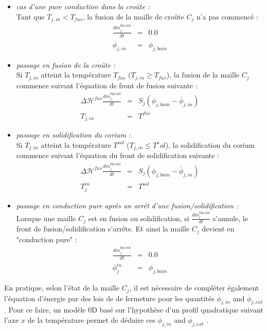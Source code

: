 \begin{itemize}
\item {\it cas d'une pure conduction dans la croûte :}\\
Tant que $T_{j,in}<T_{fus}$, la fusion de la maille de croûte $C_j$ n'a pas commencé :
\begin{eqnarray*}
\frac{dm_j^\text{fus/sol}}{dt} &=& 0.0 \\
\overline{\phi}_{j,in} &=& \phi_{j,bain}
\end{eqnarray*}

\item {\it passage en fusion de la croûte :}\\
Si $T_{j,in}$ atteint la température $T_{fus}$ ($T_{j,in}\ge T_{fus}$), la fusion de la maille $C_j$ commence suivant l'équation de front de fusion suivante :
\begin{eqnarray*}
\Delta \mathcal{H}^{fus} \frac{dm_j^\text{fus/sol}}{dt} &=& S_j\left(\phi_{j,bain} - \overline{\phi}_{j,in}\right) \\
T_{j,in} &=& T^{fus}
\end{eqnarray*}

\item {\it passage en solidification du corium :}\\
Si $T_{j,in}$ atteint la température $T^{sol}$ ($T_{j,in}\le T^sol$), la solidification du corium commence suivant l'équation du front de solidification suivante :
\begin{eqnarray*}
\Delta \mathcal{H}^{fus} \frac{dm_j^\text{fus/sol}}{dt} &=& S_j\left(\phi_{j,bain} - \overline{\phi}_{j,in}\right) \\
T_j^{in} &=& T^{sol}
\end{eqnarray*}

\item {\it passage en conduction pure après un arrêt d'une fusion/solidification :}\\
Lorsque une maille $C_j$ est en fusion ou solidification, si $\frac{dm_i^\text{fus/sol}}{dt}$ s'annule, le front de fusion/solidification s'arrête. Et ainsi la maille $C_j$ devient en "conduction pure" :
\begin{eqnarray*}
\frac{dm_j^\text{fus/sol}}{dt} &=& 0.0 \\
\phi_j^{in} &=& \phi_{j,bain}
\end{eqnarray*}
\end{itemize}

En pratique, selon l'état de la maille $C_j$, il est nécessaire de compléter également l'équation d'énergie par des lois de de fermeture pour les quantités $\overline{\phi}_{j,in}$ and $\overline{\phi}_{j,ext}$. Pour ce faire, un modèle 0D basé sur l'hypothèse d'un profil quadratique suivant l'axe $x$ de la température permet de déduire ces $\overline{\phi}_{j,in}$ and $\overline{\phi}_{j,ext}$ \cite{LeTellier2016}.
